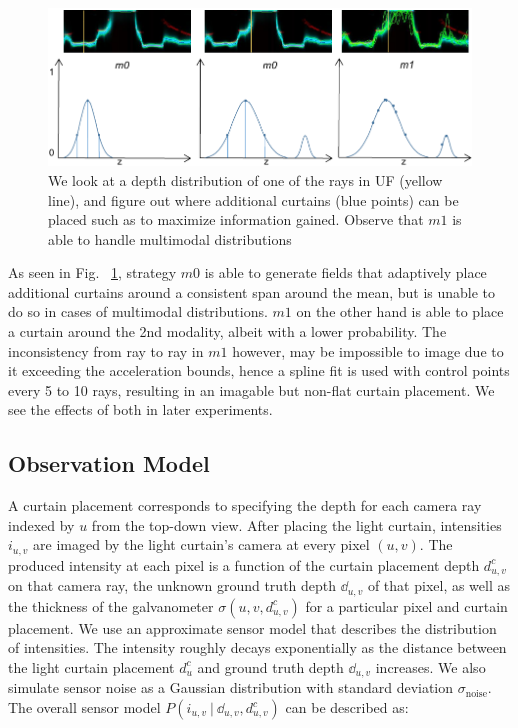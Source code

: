 \begin{figure}[h]
   \centering
   \begin{minipage}{0.5\textwidth}
       \centering
       \includegraphics[width=1.0\textwidth]{figures/fields.pdf}
   \end{minipage}\hfill
   \centering
   \caption{We look at a depth distribution of one of the rays in UF (yellow line), and figure out where additional curtains (blue points) can be placed such as to maximize information gained. Observe that $m1$ is able to handle multimodal distributions}
   \label{fig:m0m1}
\end{figure}

As seen in Fig. ~\ref{fig:m0m1}, strategy $m0$ is able to generate fields that adaptively place additional curtains around a consistent span around the mean, but is unable to do so in cases of multimodal distributions. $m1$ on the other hand is able to place a curtain around the 2nd modality, albeit with a lower probability. The inconsistency from ray to ray in $m1$ however, may be impossible to image due to it exceeding the acceleration bounds, hence a spline fit is used with control points every 5 to 10 rays, resulting in an imagable but non-flat curtain placement. We see the effects of both in later experiments.

\subsection{Observation Model}

A curtain placement corresponds to specifying the depth for each camera ray indexed by $u$ from the top-down view. After placing the light curtain, intensities $i_{u,v}$ are imaged by the light curtain's camera at every pixel $(u, v)$. The produced intensity at each pixel is a function of the curtain placement depth $d^c_{u, v}$ on that camera ray, the unknown ground truth depth $\dd_{u, v}$ of that pixel, as well as the thickness of the galvanometer $\sigma(u, v, d^c_{u, v})$ for a particular pixel and curtain placement. We use an approximate sensor model that describes the distribution of intensities. The intensity roughly decays exponentially as the distance between the light curtain placement $d^c_u$ and ground truth depth $\dd_{u, v}$ increases.  We also simulate sensor noise as a Gaussian distribution with standard deviation $\sigma_\text{noise}$. The overall sensor model $P(i_{u, v}\ |\ \dd_{u, v}, d^c_{u, v})$ can be described as:

